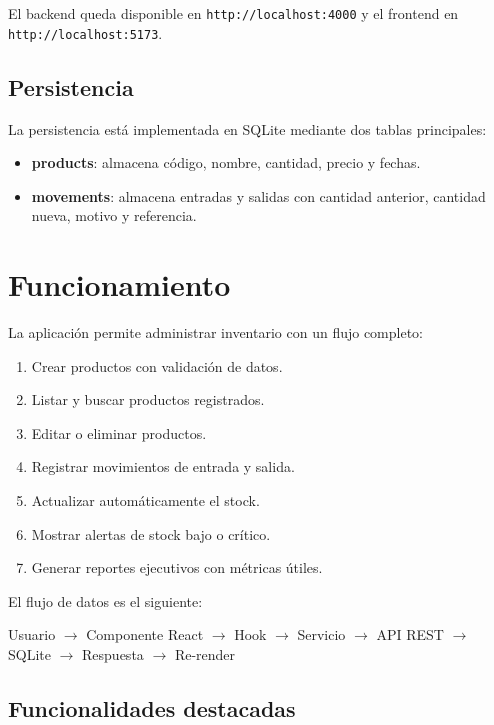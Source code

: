 \documentclass[12pt,a4paper]{article}
\begin{document}
El backend queda disponible en \texttt{http://localhost:4000} y el frontend en \texttt{http://localhost:5173}.

\subsection{Persistencia}

La persistencia está implementada en SQLite mediante dos tablas principales:

\begin{itemize}[leftmargin=1.2cm]
    \item \textbf{products}: almacena código, nombre, cantidad, precio y fechas.
    \item \textbf{movements}: almacena entradas y salidas con cantidad anterior, cantidad nueva, motivo y referencia.
\end{itemize}

\newpage

\section{Funcionamiento}

La aplicación permite administrar inventario con un flujo completo:

\begin{enumerate}[leftmargin=1.2cm]
    \item Crear productos con validación de datos.
    \item Listar y buscar productos registrados.
    \item Editar o eliminar productos.
    \item Registrar movimientos de entrada y salida.
    \item Actualizar automáticamente el stock.
    \item Mostrar alertas de stock bajo o crítico.
    \item Generar reportes ejecutivos con métricas útiles.
\end{enumerate}

El flujo de datos es el siguiente:

\begin{center}
Usuario $\rightarrow$ Componente React $\rightarrow$ Hook $\rightarrow$ Servicio $\rightarrow$ API REST $\rightarrow$ SQLite $\rightarrow$ Respuesta $\rightarrow$ Re-render
\end{center}

\subsection{Funcionalidades destacadas}
\end{document}

